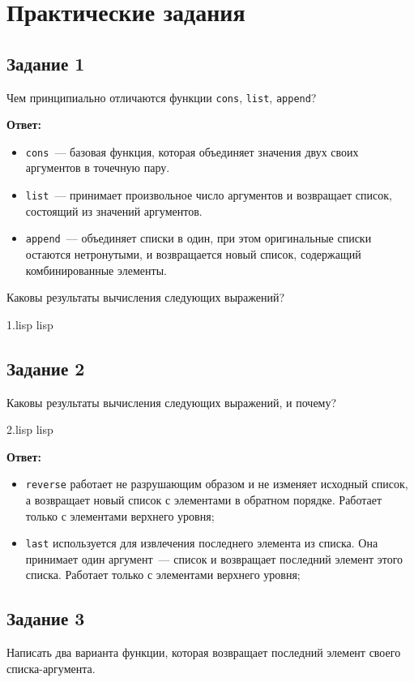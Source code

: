 \chapter{Практические задания}

\section{Задание 1}
Чем принципиально отличаются функции \texttt{cons}, \texttt{list},  \texttt{append}?

\textbf{Ответ:} 
\begin{itemize}
	\item \texttt{cons}~--- базовая функция, которая объединяет значения двух своих аргументов в точечную пару.
	\item \texttt{list}~--- принимает произвольное число аргументов и возвращает список, состоящий из значений аргументов. 
	\item \texttt{append}~--- объединяет списки в один, при этом оригинальные списки остаются нетронутыми, и возвращается новый список, содержащий комбинированные элементы.
\end{itemize}

Каковы результаты вычисления следующих выражений?

{1.lisp}
{lisp}
{}

\section{Задание 2}
Каковы результаты вычисления следующих выражений, и почему?

{2.lisp}
{lisp}
{}

\clearpage

\textbf{Ответ:}
\begin{itemize}
	\item \texttt{reverse} работает не разрушающим образом и не изменяет исходный список, а возвращает новый список с элементами в обратном порядке. Работает только с элементами верхнего уровня; 
	\item \texttt{last} используется для извлечения последнего элемента из списка. Она принимает один аргумент~--- список и возвращает последний элемент этого списка. Работает только с элементами верхнего уровня;
\end{itemize}

\section{Задание 3}
Написать два варианта функции, которая возвращает последний элемент своего списка-аргумента.

